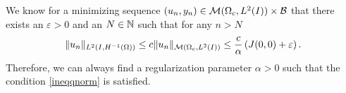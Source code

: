\begin{remark}
 We know for a minimizing sequence $(u_n, y_n)\in \mathcal{M}(\Omega_c, L^{2}(I))\times \mathcal B$ that there exists an $\varepsilon > 0$ and an $N \in \mathbb{N} $ such that for any $n > N$
 \[
\lVert u_n\rVert_{L^2(I,H^{-1}(\Omega))} \leq c\lVert u_n\rVert_{\mathcal{M}(\Omega_c, L^{2}(I))} \leq \frac{c}{\alpha}\left(J(0,0) + \varepsilon \right).
 \]
 Therefore, we can always find a regularization parameter $\alpha>0$ such that the condition \eqref{ineqqnorm} is satisfied.
\end{remark}

